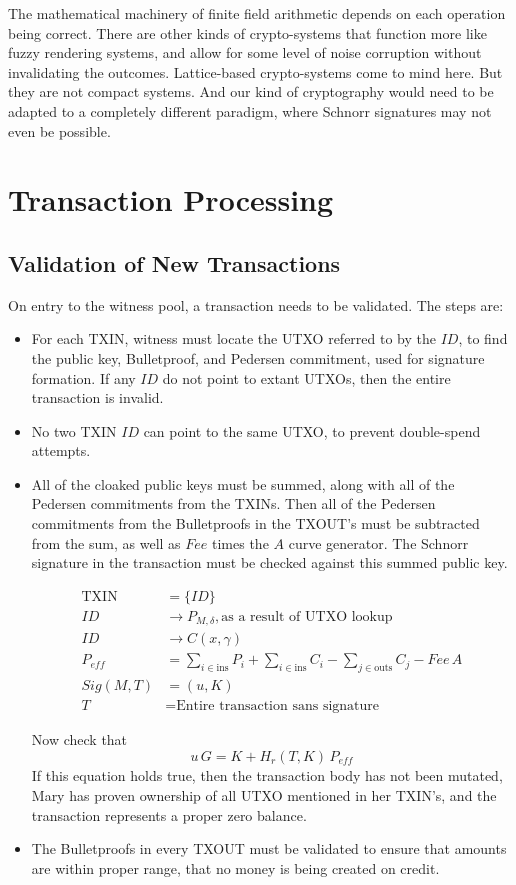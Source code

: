 \documentclass[a4paper, 10pt, conference]{ieeeconf}
\begin{document}
The mathematical machinery of finite field arithmetic depends on each operation being correct. There are other kinds of crypto-systems that function more like fuzzy rendering systems, and allow for some level of noise corruption without invalidating the outcomes. Lattice-based crypto-systems come to mind here. But they are not compact systems. And our kind of cryptography would need to be adapted to a completely different paradigm, where Schnorr signatures may not even be possible.

\section{Transaction Processing}
\subsection{Validation of New Transactions}
On entry to the witness pool, a transaction needs to be validated. The steps are:
\begin{itemize}
\item{For each TXIN, witness must locate the UTXO referred to by the $\mathit{ID}$, to find the public key, Bulletproof, and Pedersen commitment, used for signature formation. If any $\mathit{ID}$ do not point to extant UTXOs, then the entire transaction is invalid.}
\item{No two TXIN $\mathit{ID}$ can point to the same UTXO, to prevent double-spend attempts.}
\item{All of the cloaked public keys must be summed, along with all of the Pedersen commitments from the TXINs. Then all of the Pedersen commitments from the Bulletproofs in the TXOUT's must be subtracted from the sum, as well as $\mathit{Fee}$ times the $A$ curve generator. The Schnorr signature in the transaction must be checked against this summed public key.

\begin{align}
\text{TXIN} &= \{ID\} \\
ID &\rightarrow P_{M, \delta}, \text{as a result of UTXO lookup}\\
ID &\rightarrow C(x, \gamma)\\
P_{eff} &= \sum_{i \in \text{ins}}{P_i} + \sum_{i \in \text{ins}}{C_i}  - \sum_{j \in \text{outs}}{C_j} - Fee\,A\\
Sig(M, T) &= (u, K)\\
T &= \text{Entire transaction sans signature}
\end{align}

Now check that
$$u \, G = K + H_r(T, K) \, P_{\mathit{eff}}$$
If this equation holds true, then the transaction body has not been mutated, Mary has proven ownership of all UTXO mentioned in her TXIN's, and the transaction represents a proper zero balance.}
\item{The Bulletproofs in every TXOUT must be validated to ensure that amounts are within proper range, that no money is being created on credit.}
\end{itemize}
\end{document}
